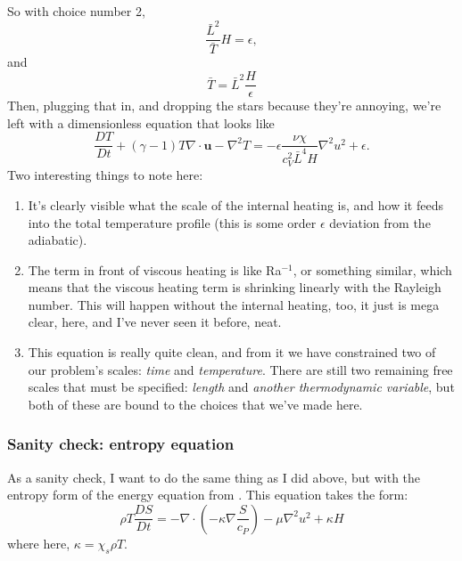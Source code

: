 \documentclass[aps, pre, onecolumn, nofootinbib, notitlepage, groupedaddress, amsfonts, amssymb, amsmath, longbibliography]{revtex4-1}
\newcommand{\grad}{\ensuremath{\nabla}}
\begin{document}
So with choice number 2,
$$
\frac{\bar{L}^2}{\bar{T}} H  = \epsilon,
$$
and
$$
\bar{T} = \bar{L}^2 \frac{H}{\epsilon}
$$
Then, plugging that in, and dropping the stars because they're annoying, we're left with
a dimensionless equation that looks like
\begin{equation}
\boxed{
\frac{D T}{D t} + (\gamma - 1) T \grad\cdot\bm{u} - \grad^2 T 
= -\epsilon \frac{\nu\chi}{c_V^2 \bar{L}^4 H} \grad^2 u^2 + \epsilon}.
\end{equation}
Two interesting things to note here:
\begin{enumerate}
\item It's clearly visible what the scale of the internal heating is, and how it feeds into
the total temperature profile (this is some order $\epsilon$ deviation from the adiabatic).
\item The term in front of viscous heating is like Ra$^{-1}$, or something similar, which
means that the viscous heating term is shrinking linearly with the Rayleigh number.  This
will happen without the internal heating, too, it just is mega clear, here, and I've never
seen it before, neat.
\item This equation is really quite clean, and from it we have constrained two of our problem's
scales: \emph{time} and \emph{temperature}.  There are still two remaining free scales that
must be specified: \emph{length} and \emph{another thermodynamic variable}, but both of
these are bound to the choices that we've made here.
\end{enumerate}

\subsubsection{Sanity check: entropy equation}
As a sanity check, I want to do the same thing as I did above, but with the entropy
form of the energy equation from \cite{lecoanet&all2014}.  This equation takes the form:
\begin{equation}
\rho T \frac{D S}{D t} = -\grad \cdot (-\kappa \grad \frac{S}{c_P}) - \mu \grad^2 u^2 + \kappa H 
\end{equation}
where here, $\kappa = \chi_s \rho T$.
\end{document}
